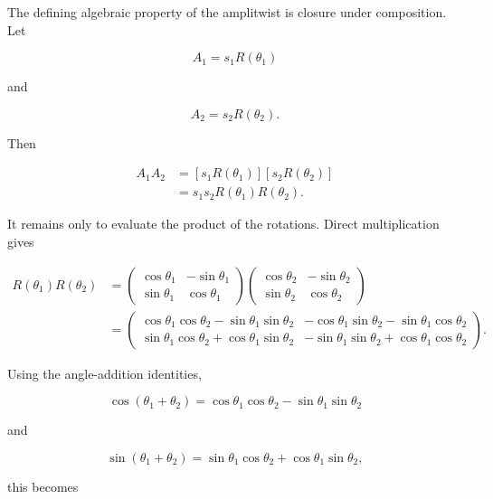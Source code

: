 \documentclass[11pt]{article}
\begin{document}
The defining algebraic property of the amplitwist is closure under composition. Let

\begin{equation}
A_1=s_1R(\theta_1)
\end{equation}

and

\begin{equation}
A_2=s_2R(\theta_2).
\end{equation}

Then

\begin{align}
A_1A_2
&=
\left[s_1R(\theta_1)\right]
\left[s_2R(\theta_2)\right]\\
&=
s_1s_2R(\theta_1)R(\theta_2).
\end{align}

It remains only to evaluate the product of the rotations. Direct multiplication gives

\begin{align}
R(\theta_1)R(\theta_2)
&=
\begin{pmatrix}
\cos\theta_1 & -\sin\theta_1\\
\sin\theta_1 & \cos\theta_1
\end{pmatrix}
\begin{pmatrix}
\cos\theta_2 & -\sin\theta_2\\
\sin\theta_2 & \cos\theta_2
\end{pmatrix}\\
&=
\begin{pmatrix}
\cos\theta_1\cos\theta_2-\sin\theta_1\sin\theta_2
&
-\cos\theta_1\sin\theta_2-\sin\theta_1\cos\theta_2
\\
\sin\theta_1\cos\theta_2+\cos\theta_1\sin\theta_2
&
-\sin\theta_1\sin\theta_2+\cos\theta_1\cos\theta_2
\end{pmatrix}.
\end{align}

Using the angle-addition identities,

\begin{equation}
\cos(\theta_1+\theta_2)
=
\cos\theta_1\cos\theta_2-\sin\theta_1\sin\theta_2
\end{equation}

and

\begin{equation}
\sin(\theta_1+\theta_2)
=
\sin\theta_1\cos\theta_2+\cos\theta_1\sin\theta_2,
\end{equation}

this becomes
\end{document}
